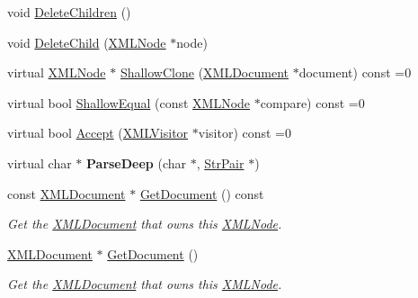 \begin{DoxyCompactItemize}
\item 
void \hyperlink{classtinyxml2_1_1XMLNode_a0360085cc54df5bff85d5c5da13afdce}{Delete\+Children} ()
\item 
void \hyperlink{classtinyxml2_1_1XMLNode_a363b6edbd6ebd55f8387d2b89f2b0921}{Delete\+Child} (\hyperlink{classtinyxml2_1_1XMLNode}{X\+M\+L\+Node} $\ast$node)
\item 
virtual \hyperlink{classtinyxml2_1_1XMLNode}{X\+M\+L\+Node} $\ast$ \hyperlink{classtinyxml2_1_1XMLNode_a8402cbd3129d20e9e6024bbcc0531283}{Shallow\+Clone} (\hyperlink{classtinyxml2_1_1XMLDocument}{X\+M\+L\+Document} $\ast$document) const =0
\item 
virtual bool \hyperlink{classtinyxml2_1_1XMLNode_a7ce18b751c3ea09eac292dca264f9226}{Shallow\+Equal} (const \hyperlink{classtinyxml2_1_1XMLNode}{X\+M\+L\+Node} $\ast$compare) const =0
\item 
virtual bool \hyperlink{classtinyxml2_1_1XMLNode_a81e66df0a44c67a7af17f3b77a152785}{Accept} (\hyperlink{classtinyxml2_1_1XMLVisitor}{X\+M\+L\+Visitor} $\ast$visitor) const =0
\item 
\mbox{\label{classtinyxml2_1_1XMLNode_a7610d0f603e8b603d2078521811a23c1}} 
virtual char $\ast$ {\bfseries Parse\+Deep} (char $\ast$, \hyperlink{classtinyxml2_1_1StrPair}{Str\+Pair} $\ast$)
\item 
\mbox{\label{classtinyxml2_1_1XMLNode_a2de84cfa4ec3fe249bad745069d145f1}} 
const \hyperlink{classtinyxml2_1_1XMLDocument}{X\+M\+L\+Document} $\ast$ \hyperlink{classtinyxml2_1_1XMLNode_a2de84cfa4ec3fe249bad745069d145f1}{Get\+Document} () const
\begin{DoxyCompactList}\small\item\em Get the \hyperlink{classtinyxml2_1_1XMLDocument}{X\+M\+L\+Document} that owns this \hyperlink{classtinyxml2_1_1XMLNode}{X\+M\+L\+Node}. \end{DoxyCompactList}\item 
\mbox{\label{classtinyxml2_1_1XMLNode_af343d1ef0b45c0020e62d784d7e67a68}} 
\hyperlink{classtinyxml2_1_1XMLDocument}{X\+M\+L\+Document} $\ast$ \hyperlink{classtinyxml2_1_1XMLNode_af343d1ef0b45c0020e62d784d7e67a68}{Get\+Document} ()
\begin{DoxyCompactList}\small\item\em Get the \hyperlink{classtinyxml2_1_1XMLDocument}{X\+M\+L\+Document} that owns this \hyperlink{classtinyxml2_1_1XMLNode}{X\+M\+L\+Node}. \end{DoxyCompactList}\item 

\end{DoxyCompactItemize}
